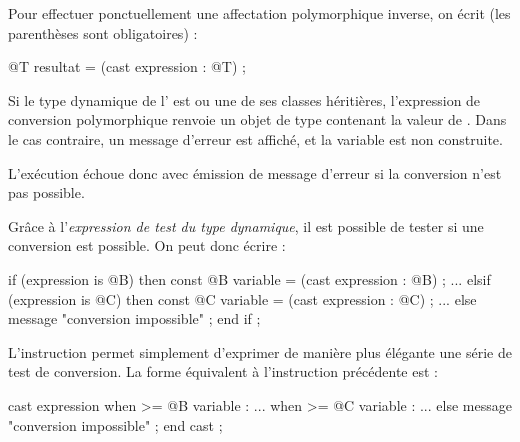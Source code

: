 Pour effectuer ponctuellement une affectation polymorphique inverse, on écrit (les parenthèses sont obligatoires) :

\begin{galgascode}
@T resultat = (cast expression : @T) ;
\end{galgascode}

Si le type dynamique de l' est  ou une de ses classes héritières, l'expression de conversion polymorphique renvoie un objet de type  contenant la valeur de . Dans le cas contraire, un message d'erreur est affiché, et la variable  est non construite.

L'exécution échoue donc avec émission de message d'erreur si la conversion n'est pas possible. 


Grâce à l'\emph{expression de test du type dynamique}, il est possible de tester si une conversion est possible. On peut donc écrire :

\begin{galgascode}
if (expression is @B) then
  const @B variable = (cast expression : @B) ;
  ...
elsif (expression is @C) then
  const @C variable = (cast expression : @C) ;
  ...
else
  message "conversion impossible" ;
end if ;
\end{galgascode}

L'instruction  permet simplement d'exprimer de manière plus élégante une série de test de conversion. La forme équivalent à l'instruction  précédente est :

\begin{galgascode}
cast expression
when >= @B variable :
  ...
when >= @C variable :
  ...
else
  message "conversion impossible" ;
end cast ;
\end{galgascode}



